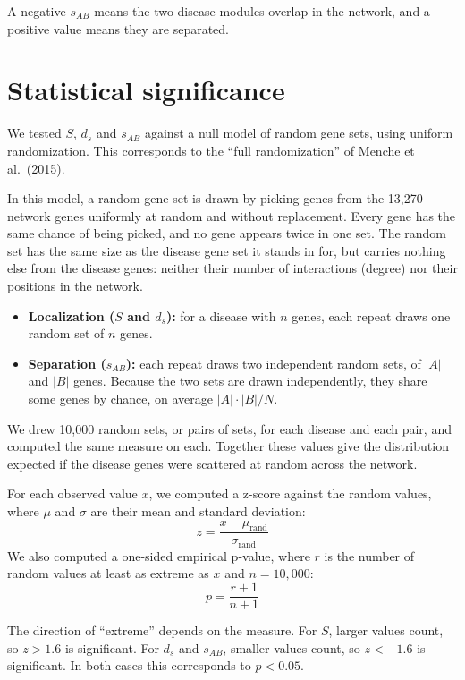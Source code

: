 \documentclass[11pt]{article}
\begin{document}
A negative $s_{AB}$ means the two disease modules overlap in the network, and a positive value means they are separated.

\section{Statistical significance}

We tested $S$, $d_s$ and $s_{AB}$ against a null model of random gene sets, using uniform randomization. This corresponds to the ``full randomization'' of Menche et al.\ (2015).

In this model, a random gene set is drawn by picking genes from the 13,270 network genes uniformly at random and without replacement. Every gene has the same chance of being picked, and no gene appears twice in one set. The random set has the same size as the disease gene set it stands in for, but carries nothing else from the disease genes: neither their number of interactions (degree) nor their positions in the network.

\begin{itemize}
  \item \textbf{Localization ($S$ and $d_s$):} for a disease with $n$ genes, each repeat draws one random set of $n$ genes.
  \item \textbf{Separation ($s_{AB}$):} each repeat draws two independent random sets, of $|A|$ and $|B|$ genes. Because the two sets are drawn independently, they share some genes by chance, on average $|A|\cdot|B|/N$.
\end{itemize}

We drew 10,000 random sets, or pairs of sets, for each disease and each pair, and computed the same measure on each. Together these values give the distribution expected if the disease genes were scattered at random across the network.

For each observed value $x$, we computed a z-score against the random values, where $\mu$ and $\sigma$ are their mean and standard deviation:
\begin{equation}
  z = \frac{x - \mu_{\text{rand}}}{\sigma_{\text{rand}}}
\end{equation}
We also computed a one-sided empirical p-value, where $r$ is the number of random values at least as extreme as $x$ and $n = 10{,}000$:
\begin{equation}
  p = \frac{r + 1}{n + 1}
\end{equation}

The direction of ``extreme'' depends on the measure. For $S$, larger values count, so $z > 1.6$ is significant. For $d_s$ and $s_{AB}$, smaller values count, so $z < -1.6$ is significant. In both cases this corresponds to $p < 0.05$.
\end{document}
